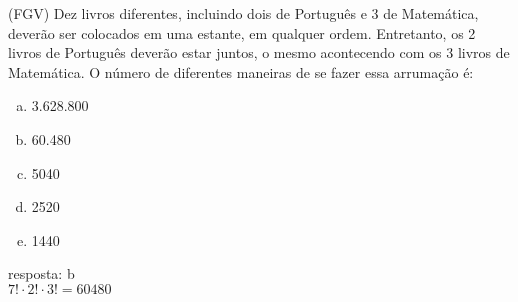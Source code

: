 \begin{ex}
 (FGV) Dez livros diferentes, incluindo dois de Português e 3 de Matemática, deverão ser colocados em uma estante, em qualquer ordem. Entretanto, os 2 livros de Português deverão estar juntos, o mesmo acontecendo com os 3 livros de Matemática. O número de diferentes maneiras de se fazer essa arrumação é:
    \begin{enumerate}[(a)]
    \item 3.628.800
    \item 60.480
    \item 5040
    \item 2520
    \item 1440
    \end{enumerate}
      \begin{sol}
        resposta: b \\
        $7!\cdot2!\cdot3!=60480$
      \end{sol}
\end{ex}